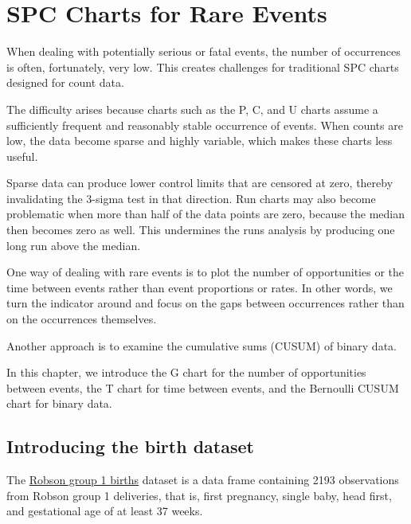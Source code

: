 \documentclass[
]{book}
\begin{document}
\chapter{SPC Charts for Rare Events}\label{spc-charts-for-rare-events}

When dealing with potentially serious or fatal events, the number of
occurrences is often, fortunately, very low. This creates challenges for
traditional SPC charts designed for count data.

The difficulty arises because charts such as the P, C, and U charts
assume a sufficiently frequent and reasonably stable occurrence of
events. When counts are low, the data become sparse and highly variable,
which makes these charts less useful.

Sparse data can produce lower control limits that are censored at zero,
thereby invalidating the 3-sigma test in that direction. Run charts may
also become problematic when more than half of the data points are zero,
because the median then becomes zero as well. This undermines the runs
analysis by producing one long run above the median.

One way of dealing with rare events is to plot the number of
opportunities or the time between events rather than event proportions
or rates. In other words, we turn the indicator around and focus on the
gaps between occurrences rather than on the occurrences themselves.

Another approach is to examine the cumulative sums (CUSUM) of binary
data.

In this chapter, we introduce the G chart for the number of
opportunities between events, the T chart for time between events, and
the Bernoulli CUSUM chart for binary data.

\section{Introducing the birth
dataset}\label{introducing-the-birth-dataset}

The \hyperref[robson-group-1-births]{Robson group 1 births} dataset is a
data frame containing 2193 observations from Robson group 1 deliveries,
that is, first pregnancy, single baby, head first, and gestational age
of at least 37 weeks.
\end{document}

